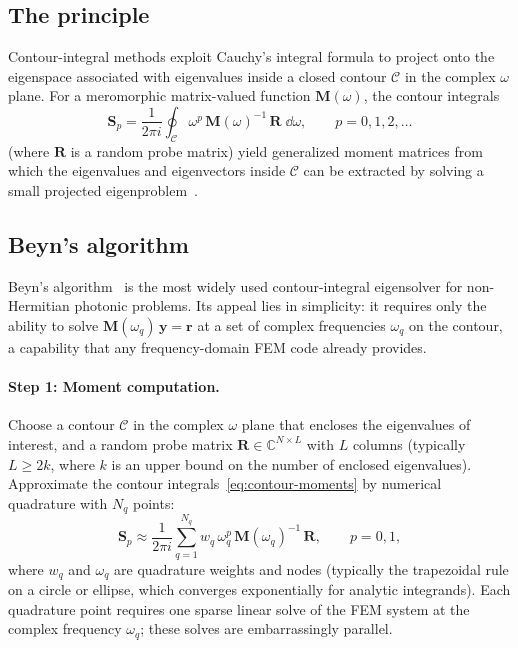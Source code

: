 \subsection{The principle}
\label{ssec:contour-principle}

Contour-integral methods exploit Cauchy's integral formula to project
onto the eigenspace associated with eigenvalues inside a closed contour
$\mathcal{C}$ in the complex $\omega$ plane. For a meromorphic
matrix-valued function $\mathbf{M}(\omega)$, the contour integrals
\begin{equation}
 \mathbf{S}_p = \frac{1}{2\pi i}\oint_{\mathcal{C}}
 \omega^p\,\mathbf{M}(\omega)^{-1}\,\mathbf{R}\;\dd\omega,
 \qquad p = 0, 1, 2, \ldots
 \label{eq:contour-moments}
\end{equation}
(where $\mathbf{R}$ is a random probe matrix) yield generalized moment
matrices from which the eigenvalues and eigenvectors inside
$\mathcal{C}$ can be extracted by solving a small projected
eigenproblem~\cite{berlin2024poles}.

\subsection{Beyn's algorithm}
\label{ssec:beyn}

Beyn's algorithm~\cite{berlin2024poles,cui2024roadmap} is the most
widely used contour-integral eigensolver for non-Hermitian photonic
problems. Its appeal lies in simplicity: it requires only the ability
to solve $\mathbf{M}(\omega_q)\,\mathbf{y} = \mathbf{r}$ at a set of
complex frequencies $\omega_q$ on the contour, a capability that any
frequency-domain FEM code already provides.

\paragraph{Step 1: Moment computation.}
Choose a contour $\mathcal{C}$ in the complex $\omega$ plane that
encloses the eigenvalues of interest, and a random probe matrix
$\mathbf{R} \in \mathbb{C}^{N \times L}$ with $L$ columns (typically
$L \ge 2k$, where $k$ is an upper bound on the number of enclosed
eigenvalues). Approximate the contour integrals~\eqref{eq:contour-moments}
by numerical quadrature with $N_q$ points:
\begin{equation}
 \mathbf{S}_p \approx \frac{1}{2\pi i}\sum_{q=1}^{N_q}
 w_q\,\omega_q^p\,\mathbf{M}(\omega_q)^{-1}\,\mathbf{R},
 \qquad p = 0, 1,
 \label{eq:beyn-quadrature}
\end{equation}
where $w_q$ and $\omega_q$ are quadrature weights and nodes (typically
the trapezoidal rule on a circle or ellipse, which converges
exponentially for analytic integrands). Each quadrature point requires
one sparse linear solve of the FEM system at the complex frequency
$\omega_q$; these solves are embarrassingly parallel.

